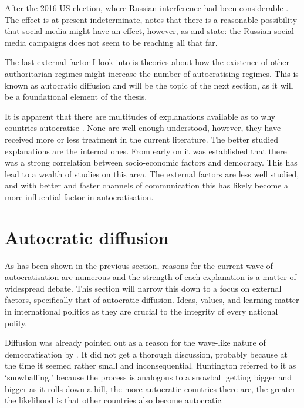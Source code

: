 After the 2016 US election, where Russian interference had been considerable \citep[pp. 14-15]{mueller_report_2019}. The effect is at present indeterminate, \citet{zhuravskaya_political_2020} notes that there is a reasonable possibility that social media might have an effect, however, as \citet{eady_exposure_2023} and \citet{guess_reshares_2023} state: the Russian social media campaigns does not seem to be reaching all that far. 

The last external factor I look into is theories about how the existence of other authoritarian regimes might increase the number of autocratising regimes. This is known as autocratic diffusion and will be the topic of the next section, as it will be a foundational element of the thesis.

It is apparent that there are multitudes of explanations available as to why countries autocratise \citep{berman_causes_2021}. None are well enough understood, however, they have received more or less treatment in the current literature. The better studied explanations are the internal ones. From early on it was established that there was a strong correlation between socio-economic factors and democracy. This has lead to a wealth of studies on this area. The external factors are less well studied, and with better and faster channels of communication this has likely become a more influential factor in autocratisation.

\section{Autocratic diffusion}
As has been shown in the previous section, reasons for the current wave of autocratisation are numerous and the strength of each explanation is a matter of widespread debate. This section will narrow this down to a focus on external factors, specifically that of autocratic diffusion. Ideas, values, and learning matter in international politics as they are crucial to the integrity of every national polity.

Diffusion was already pointed out as a reason for the wave-like nature of democratisation by \citet{huntington_third_1991}. It did not get a thorough discussion, probably because at the time it seemed rather small and inconsequential. Huntington referred to it as `snowballing,' because the process is analogous to a snowball getting bigger and bigger as it rolls down a hill, the more autocratic countries there are, the greater the likelihood is that other countries also become autocratic.

